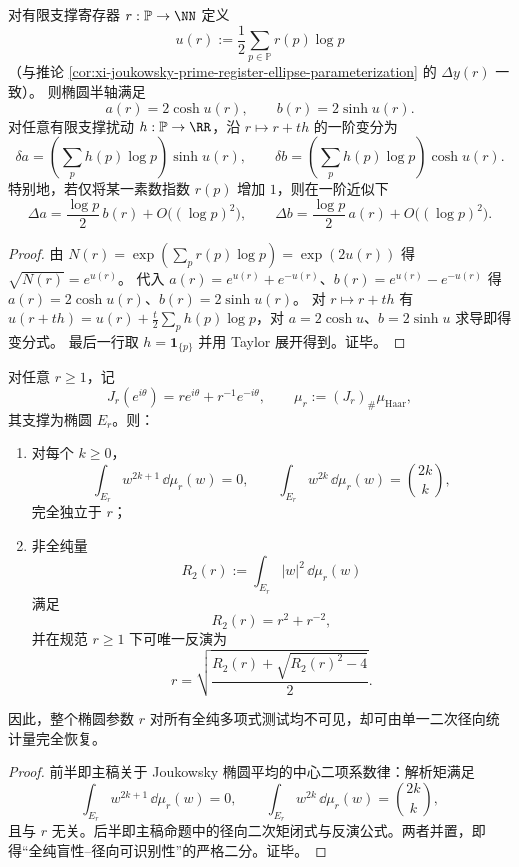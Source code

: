 \begin{theorem}\label{thm:conclusion-jg-ellipse-prime-log-generator}
对有限支撑寄存器 \(r:\mathbb P\to\NN\) 定义
\[
u(r):=\frac12\sum_{p\in\mathbb P}r(p)\log p
\]
（与推论 \ref{cor:xi-joukowsky-prime-register-ellipse-parameterization} 的 \(\Delta y(r)\) 一致）。
则椭圆半轴满足
\[
a(r)=2\cosh u(r),
\qquad
b(r)=2\sinh u(r).
\]
对任意有限支撑扰动 \(h:\mathbb P\to\RR\)，沿 \(r\mapsto r+th\) 的一阶变分为
\[
\delta a
=\left(\sum_{p}h(p)\log p\right)\sinh u(r),
\qquad
\delta b
=\left(\sum_{p}h(p)\log p\right)\cosh u(r).
\]
特别地，若仅将某一素数指数 \(r(p)\) 增加 \(1\)，则在一阶近似下
\[
\Delta a=\frac{\log p}{2}\,b(r)+O\!\bigl((\log p)^2\bigr),
\qquad
\Delta b=\frac{\log p}{2}\,a(r)+O\!\bigl((\log p)^2\bigr).
\]
\end{theorem}
\begin{proof}
由 \(N(r)=\exp(\sum_p r(p)\log p)=\exp(2u(r))\) 得 \(\sqrt{N(r)}=e^{u(r)}\)。
代入 \(a(r)=e^{u(r)}+e^{-u(r)}\)、\(b(r)=e^{u(r)}-e^{-u(r)}\) 得 \(a(r)=2\cosh u(r)\)、\(b(r)=2\sinh u(r)\)。
对 \(r\mapsto r+th\) 有 \(u(r+th)=u(r)+\tfrac{t}{2}\sum_p h(p)\log p\)，对 \(a=2\cosh u\)、\(b=2\sinh u\) 求导即得变分式。
最后一行取 \(h=\mathbf 1_{\{p\}}\) 并用 Taylor 展开得到。证毕。
\end{proof}

\begin{theorem}\label{thm:conclusion-joukowsky-holomorphic-blindness-radial-identifiability}
对任意 \(r\ge1\)，记
\[
J_r(e^{i\theta})=re^{i\theta}+r^{-1}e^{-i\theta},\qquad
\mu_r:=(J_r)_\#\mu_{\mathrm{Haar}},
\]
其支撑为椭圆 \(E_r\)。则：
\begin{enumerate}
  \item 对每个 \(k\ge0\)，
  \[
  \int_{E_r} w^{2k+1}\,\dd\mu_r(w)=0,\qquad
  \int_{E_r} w^{2k}\,\dd\mu_r(w)=\binom{2k}{k},
  \]
  完全独立于 \(r\)；
  \item 非全纯量
  \[
  R_2(r):=\int_{E_r}|w|^2\,\dd\mu_r(w)
  \]
  满足
  \[
  R_2(r)=r^2+r^{-2},
  \]
  并在规范 \(r\ge1\) 下可唯一反演为
  \[
  r=
  \sqrt{\frac{R_2(r)+\sqrt{R_2(r)^2-4}}{2}}.
  \]
\end{enumerate}
因此，整个椭圆参数 \(r\) 对所有全纯多项式测试均不可见，却可由单一二次径向统计量完全恢复。
\end{theorem}
\begin{proof}
前半即主稿关于 Joukowsky 椭圆平均的中心二项系数律：解析矩满足
\[
\int_{E_r} w^{2k+1}\,\dd\mu_r(w)=0,\qquad
\int_{E_r} w^{2k}\,\dd\mu_r(w)=\binom{2k}{k},
\]
且与 \(r\) 无关。后半即主稿命题中的径向二次矩闭式与反演公式。两者并置，即得“全纯盲性--径向可识别性”的严格二分。证毕。
\end{proof}

